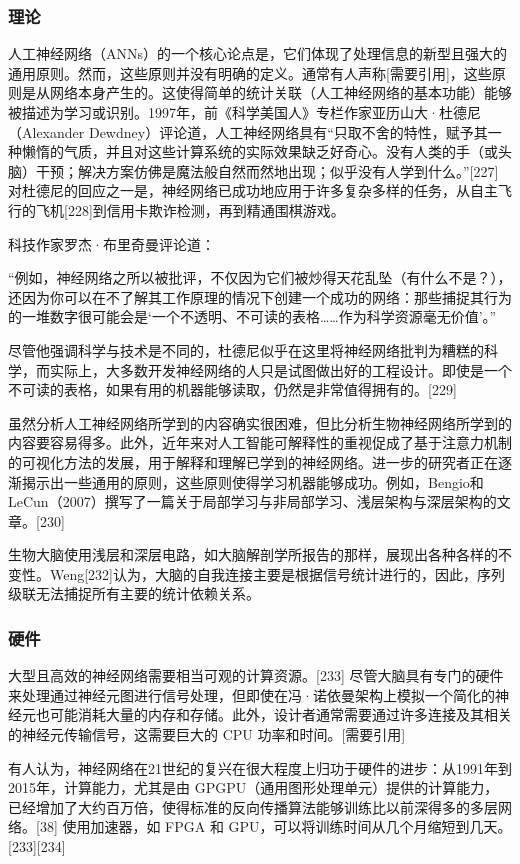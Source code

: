 \subsubsection{理论}
人工神经网络（ANNs）的一个核心论点是，它们体现了处理信息的新型且强大的通用原则。然而，这些原则并没有明确的定义。通常有人声称[需要引用]，这些原则是从网络本身产生的。这使得简单的统计关联（人工神经网络的基本功能）能够被描述为学习或识别。1997年，前《科学美国人》专栏作家亚历山大·杜德尼（Alexander Dewdney）评论道，人工神经网络具有“只取不舍的特性，赋予其一种懒惰的气质，并且对这些计算系统的实际效果缺乏好奇心。没有人类的手（或头脑）干预；解决方案仿佛是魔法般自然而然地出现；似乎没有人学到什么。”[227] 对杜德尼的回应之一是，神经网络已成功地应用于许多复杂多样的任务，从自主飞行的飞机[228]到信用卡欺诈检测，再到精通围棋游戏。

科技作家罗杰·布里奇曼评论道：

“例如，神经网络之所以被批评，不仅因为它们被炒得天花乱坠（有什么不是？），还因为你可以在不了解其工作原理的情况下创建一个成功的网络：那些捕捉其行为的一堆数字很可能会是‘一个不透明、不可读的表格……作为科学资源毫无价值’。”

尽管他强调科学与技术是不同的，杜德尼似乎在这里将神经网络批判为糟糕的科学，而实际上，大多数开发神经网络的人只是试图做出好的工程设计。即使是一个不可读的表格，如果有用的机器能够读取，仍然是非常值得拥有的。[229]

虽然分析人工神经网络所学到的内容确实很困难，但比分析生物神经网络所学到的内容要容易得多。此外，近年来对人工智能可解释性的重视促成了基于注意力机制的可视化方法的发展，用于解释和理解已学到的神经网络。进一步的研究者正在逐渐揭示出一些通用的原则，这些原则使得学习机器能够成功。例如，Bengio和LeCun（2007）撰写了一篇关于局部学习与非局部学习、浅层架构与深层架构的文章。[230]

生物大脑使用浅层和深层电路，如大脑解剖学所报告的那样，展现出各种各样的不变性。Weng[232]认为，大脑的自我连接主要是根据信号统计进行的，因此，序列级联无法捕捉所有主要的统计依赖关系。
\subsubsection{硬件}
大型且高效的神经网络需要相当可观的计算资源。[233] 尽管大脑具有专门的硬件来处理通过神经元图进行信号处理，但即使在冯·诺依曼架构上模拟一个简化的神经元也可能消耗大量的内存和存储。此外，设计者通常需要通过许多连接及其相关的神经元传输信号，这需要巨大的 CPU 功率和时间。[需要引用]

有人认为，神经网络在21世纪的复兴在很大程度上归功于硬件的进步：从1991年到2015年，计算能力，尤其是由 GPGPU（通用图形处理单元）提供的计算能力，已经增加了大约百万倍，使得标准的反向传播算法能够训练比以前深得多的多层网络。[38] 使用加速器，如 FPGA 和 GPU，可以将训练时间从几个月缩短到几天。[233][234]

